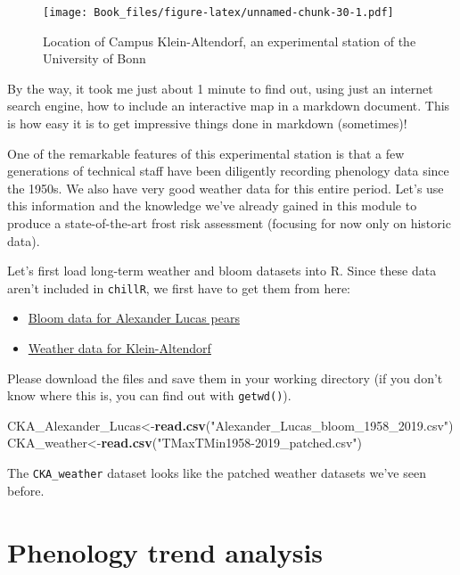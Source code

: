 \documentclass[
]{book}
\newenvironment{Shaded}{\begin{snugshade}}{\end{snugshade}}
\newcommand{\KeywordTok}[1]{\textcolor[rgb]{0.13,0.29,0.53}{\textbf{#1}}}
\newcommand{\NormalTok}[1]{#1}
\newcommand{\StringTok}[1]{\textcolor[rgb]{0.31,0.60,0.02}{#1}}
\providecommand{\tightlist}{%
  \setlength{\itemsep}{0pt}\setlength{\parskip}{0pt}}
\begin{document}
\begin{figure}
\centering
\texttt{[image: Book\_files/figure-latex/unnamed-chunk-30-1.pdf]}
\caption{\label{fig:unnamed-chunk-30}Location of Campus Klein-Altendorf, an experimental station of the University of Bonn}
\end{figure}

By the way, it took me just about 1 minute to find out, using just an internet search engine, how to include an interactive map in a markdown document. This is how easy it is to get impressive things done in markdown (sometimes)!

One of the remarkable features of this experimental station is that a few generations of technical staff have been diligently recording phenology data since the 1950s. We also have very good weather data for this entire period. Let's use this information and the knowledge we've already gained in this module to produce a state-of-the-art frost risk assessment (focusing for now only on historic data).

Let's first load long-term weather and bloom datasets into R. Since these data aren't included in \texttt{chillR}, we first have to get them from here:

\begin{itemize}
\tightlist
\item
  \href{https://uni-bonn.sciebo.de/s/0NO4Kyq3oTU0wSC}{Bloom data for Alexander Lucas pears}
\item
  \href{https://uni-bonn.sciebo.de/s/6FQh5tWhemQc2qw}{Weather data for Klein-Altendorf}
\end{itemize}

Please download the files and save them in your working directory (if you don't know where this is, you can find out with \texttt{getwd()}).

\begin{Shaded}
\begin{Highlighting}[]
\NormalTok{CKA_Alexander_Lucas<-}\KeywordTok{read.csv}\NormalTok{(}\StringTok{"Alexander_Lucas_bloom_1958_2019.csv"}\NormalTok{)}
\NormalTok{CKA_weather<-}\KeywordTok{read.csv}\NormalTok{(}\StringTok{"TMaxTMin1958-2019_patched.csv"}\NormalTok{)}
\end{Highlighting}
\end{Shaded}

The \texttt{CKA\_weather} dataset looks like the patched weather datasets we've seen before.

\hypertarget{phenology-trend-analysis}{%
\section{Phenology trend analysis}\label{phenology-trend-analysis}}
\end{document}
